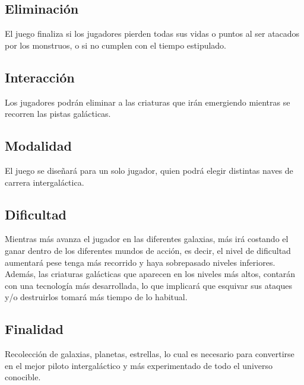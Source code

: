 \documentclass{article}
\begin{document}
\subsection{Eliminación}
El juego finaliza si los jugadores pierden todas sus vidas o puntos al ser atacados por los monstruos, o si no cumplen con el tiempo estipulado.

\subsection{Interacción}
Los jugadores podrán eliminar a las criaturas que irán emergiendo mientras se recorren las pistas galácticas.

\subsection{Modalidad}
El juego se diseñará para un solo jugador, quien podrá elegir distintas naves de carrera intergaláctica.

\subsection{Dificultad}
Mientras más avanza el jugador en las diferentes galaxias, más irá costando el ganar dentro de los diferentes mundos de acción, es decir, el nivel de dificultad aumentará pese tenga más recorrido y haya sobrepasado niveles inferiores. Además, las criaturas galácticas que aparecen en los niveles más altos, contarán con una tecnología más desarrollada, lo que implicará que esquivar sus ataques y/o destruirlos tomará más tiempo de lo habitual. 

\subsection{Finalidad}
Recolección de galaxias, planetas, estrellas, lo cual es necesario para convertirse en el mejor piloto intergaláctico y más experimentado de todo el universo conocible. 
\newpage



\cite{calistenia}
\end{document}
